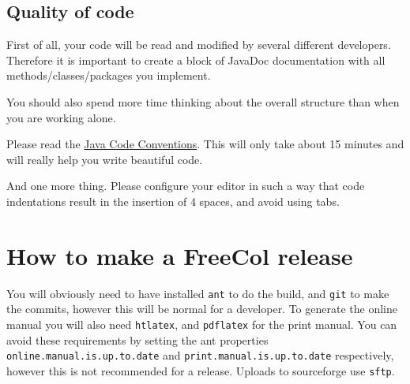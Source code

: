 \documentclass[12pt]{book}
\begin{document}
\hypertarget{Quality of code}{\section{Quality of code}}

First of all, your code will be read and modified by several
different developers.  Therefore it is important to create a
block of JavaDoc documentation with all methods/classes/packages
you implement.

You should also spend more time thinking about the overall
structure than when you are working alone.

Please read the \href{http://java.sun.com/docs/codeconv/}{Java Code
  Conventions}.  This will only take about 15 minutes and will really
help you write beautiful code.

And one more thing.  Please configure your editor in such a way
that code indentations result in the insertion of 4 spaces, and avoid
using tabs.


\hypertarget{How to build a FreeCol release}{\chapter{How to make a FreeCol release}}

You will obviously need to have installed \texttt{ant} to do the
build, and \texttt{git} to make the commits, however this will be
normal for a developer.  To generate the online manual you will also
need \texttt{htlatex}, and \texttt{pdflatex} for the print manual.
You can avoid these requirements by setting the ant properties
\texttt{online.manual.is.up.to.date} and
\texttt{print.manual.is.up.to.date} respectively, however this is not
recommended for a release.  Uploads to sourceforge use \texttt{sftp}.
\end{document}
